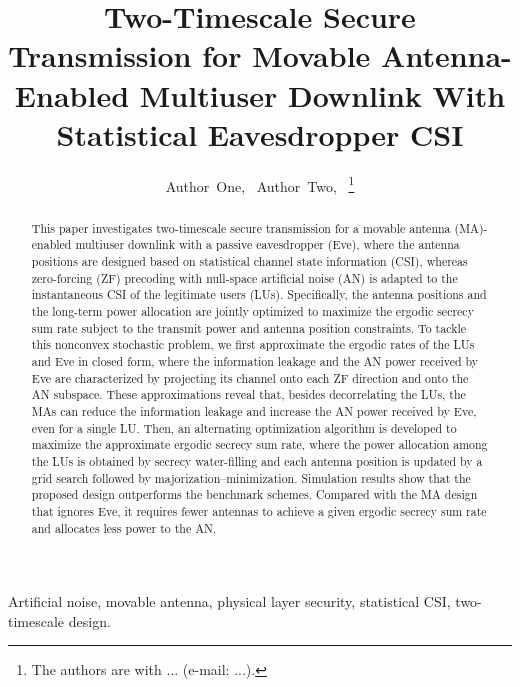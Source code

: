 \documentclass[journal]{IEEEtran}
\newcommand{\rev}[1]{{\color{red}#1}}
\newcommand{\rev}[1]{#1}
\begin{document}
\title{Two-Timescale Secure Transmission for Movable Antenna-Enabled Multiuser Downlink With Statistical Eavesdropper CSI}

\author{Author~One,~
        Author~Two,~
\thanks{The authors are with ... (e-mail: ...).}}


\maketitle

\begin{abstract}
This paper investigates two-timescale secure transmission for a movable antenna (MA)-enabled multiuser downlink with a passive eavesdropper (Eve), where the antenna positions are designed based on statistical channel state information (CSI), whereas zero-forcing (ZF) precoding with null-space artificial noise (AN) is adapted to the instantaneous CSI of the legitimate users (LUs). Specifically, the antenna positions and the long-term power allocation are jointly optimized to maximize the ergodic secrecy sum rate subject to the transmit power and antenna position constraints. To tackle this nonconvex stochastic problem, we first approximate the ergodic rates of the LUs and Eve in closed form, where the information leakage and the AN power received by Eve are characterized by \rev{projecting its channel onto each ZF direction and onto} the AN subspace. These approximations reveal that, besides decorrelating the LUs, the MAs can reduce the information leakage and increase the AN power received by Eve, even for a single LU. Then, an alternating optimization algorithm is developed to maximize the approximate ergodic secrecy sum rate, where the power allocation among the LUs is obtained by secrecy water-filling and each antenna position is updated by a grid search followed by majorization--minimization. Simulation results show that the proposed design outperforms the benchmark schemes. \rev{Compared with the MA design that ignores Eve, it requires fewer antennas to achieve a given ergodic secrecy sum rate and allocates less power to the AN.}
\end{abstract}

\begin{IEEEkeywords}
Artificial noise, movable antenna, physical layer security, statistical CSI, two-timescale design.
\end{IEEEkeywords}
\end{document}
